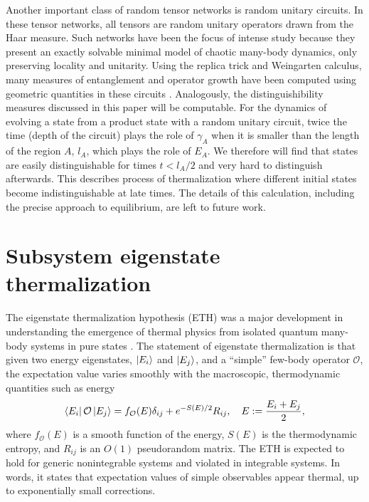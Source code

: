 \documentclass[a4paper,11pt]{article}
\begin{document}
Another important class of random tensor networks is random unitary circuits. In these tensor networks, all tensors are random unitary operators drawn from the Haar measure. Such networks have been the focus of intense study because they present an exactly solvable minimal model of chaotic many-body dynamics, only preserving locality and unitarity. Using the replica trick and Weingarten calculus, many measures of entanglement and operator growth have been computed using geometric quantities in these circuits \cite{2017PhRvX...7c1016N,2018PhRvX...8b1013V,2018PhRvX...8b1014N,2018arXiv180300089J,2019arXiv190512053H,2020JHEP...01..031K,2019JHEP...12..020W,2019arXiv191208918L,2020JHEP...04..074K,2020arXiv200514243K}. Analogously, the distinguishibility measures discussed in this paper will be computable. For the dynamics of evolving a state from a product state with a random unitary circuit, twice the time (depth of the circuit) plays the role of $\gamma_A$ when it is smaller than the length of the region $A$, $l_A$, which plays the role of $E_A$. We therefore will find that states are easily distinguishable for times $t < l_A/2$ and very hard to distinguish afterwards. This describes process of thermalization where different initial states become indistinguishable at late times. The details of this calculation, including the precise approach to equilibrium, are left to future work.

\section{Subsystem eigenstate thermalization}
\label{sETH_sec}


The eigenstate thermalization hypothesis (ETH) was a major development in understanding the emergence of thermal physics from isolated quantum many-body systems in pure states \cite{1991PhRvA..43.2046D, 1994PhRvE..50..888S,2018RPPh...81h2001D}. The statement of eigenstate thermalization is that given two energy eigenstates, $\ket{E_i}$ and $\ket{E_j}$, and a ``simple'' few-body operator $\mathcal{O}$, the expectation value varies smoothly with the macroscopic, thermodynamic quantities such as energy
\begin{align}
    \bra{E_i}\mathcal{O}\ket{E_j} = f_{\mathcal{O}}(E)\delta_{ij} + e^{-S(E)/2}R_{ij}, \quad E := \frac{E_i + E_j}{2},
\end{align}
where $f_{\mathcal{O}}(E)$ is a smooth function of the energy, $S(E)$ is the thermodynamic entropy, and $R_{ij}$ is an $O(1)$ pseudorandom matrix. The ETH is expected to hold for generic nonintegrable systems and violated in integrable systems. In words, it states that expectation values of simple observables appear thermal, up to exponentially small corrections. 
\end{document}
